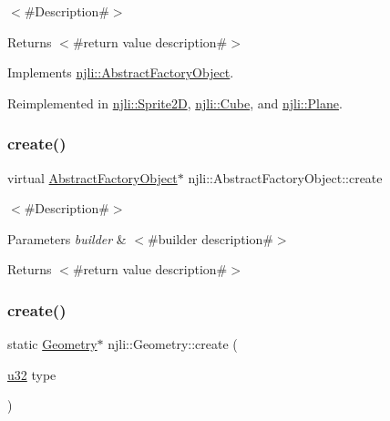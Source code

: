 $<$\#\+Description\#$>$

\begin{DoxyReturn}{Returns}
$<$\#return value description\#$>$ 
\end{DoxyReturn}


Implements \mbox{\hyperlink{classnjli_1_1_abstract_factory_object_a4763d05bc9dc37c559111f8bb30e1dd8}{njli\+::\+Abstract\+Factory\+Object}}.



Reimplemented in \mbox{\hyperlink{classnjli_1_1_sprite2_d_a4151be6ec53acfacc209ec1a0755a671}{njli\+::\+Sprite2D}}, \mbox{\hyperlink{classnjli_1_1_cube_a1e825a45f0d5562df188067854283d1b}{njli\+::\+Cube}}, and \mbox{\hyperlink{classnjli_1_1_plane_a7f585c76d7bd568c089c91c12cba4982}{njli\+::\+Plane}}.

\mbox{\label{classnjli_1_1_geometry_a83a8876ae63b92804004cf3febe76573}} 
\subsubsection{\texorpdfstring{create()}{create()}\hspace{0.1cm}{\footnotesize\ttfamily [1/2]}}
{\footnotesize\ttfamily virtual \mbox{\hyperlink{classnjli_1_1_abstract_factory_object}{Abstract\+Factory\+Object}}$\ast$ njli\+::\+Abstract\+Factory\+Object\+::create}

$<$\#\+Description\#$>$


\begin{DoxyParams}{Parameters}
{\em builder} & $<$\#builder description\#$>$\\
\hline
\end{DoxyParams}
\begin{DoxyReturn}{Returns}
$<$\#return value description\#$>$ 
\end{DoxyReturn}
\mbox{\label{classnjli_1_1_geometry_a1b2b50024e18bfce206656b91440dfd1}} 
\subsubsection{\texorpdfstring{create()}{create()}\hspace{0.1cm}{\footnotesize\ttfamily [2/2]}}
{\footnotesize\ttfamily static \mbox{\hyperlink{classnjli_1_1_geometry}{Geometry}}$\ast$ njli\+::\+Geometry\+::create (\begin{DoxyParamCaption}\item[{\mbox{\hyperlink{_util_8h_a10e94b422ef0c20dcdec20d31a1f5049}{u32}}}]{type }\end{DoxyParamCaption})\hspace{0.3cm}{\ttfamily [static]}}

